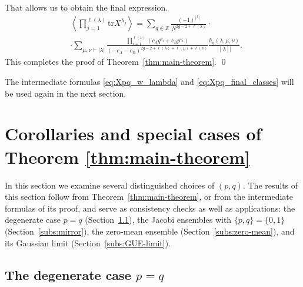 \documentclass{article}
\newcommand{\tr}{\mathrm{tr}}
\theoremstyle{plain}
\theoremstyle{definition}
\numberwithin{equation}{section}
\begin{document}
That allows us to obtain the final expression.
\begin{equation}
    \begin{aligned}
        & \left<\prod_{j=1}^{\ell(\lambda)}\tr X^{\lambda_{j}}\right> = \sum\limits_{g \in \mathbb{Z}} \frac{(-1)^{|\lambda|}}{N^{2g-2+ \ell(\lambda)}}\cdot\\
        & \cdot \sum\limits_{\mu, \nu \vdash |\lambda|} \frac{\prod_{i=1}^{\ell(\nu)}\left( c_A q^{\nu_{i}} + c_B p^{\nu_{i}} \right)}{(-c_{A} - c_{B})^{2g-2 + \ell(\lambda) + \ell(\mu) + \ell(\nu)}} \frac{h_{g}(\lambda, \mu, \nu)}{|[\lambda]|}. 
    \end{aligned}
\end{equation}
This completes the proof of Theorem~\ref{thm:main-theorem}. \qed

The intermediate formulas \eqref{eq:Xpq_w_lambda} and \eqref{eq:Xpq_final_classes} will be used again in the next section.

\section{Corollaries and special cases of Theorem \ref{thm:main-theorem}}
\label{sec:particular-p-q}

In this section we examine several distinguished choices of $(p,q)$. The
results of this section follow from Theorem~\ref{thm:main-theorem}, or from
the intermediate formulas of its proof, and serve as consistency checks as
well as applications: the degenerate case $p=q$ (Section~\ref{subs:p=q}), the
Jacobi ensembles with $\{p,q\}=\{0,1\}$ (Section~\ref{subs:mirror}), the zero-mean ensemble
(Section~\ref{subs:zero-mean}), and its Gaussian limit (Section~\ref{subs:GUE-limit}).

\subsection{The degenerate case $p=q$}
\label{subs:p=q}
\end{document}
